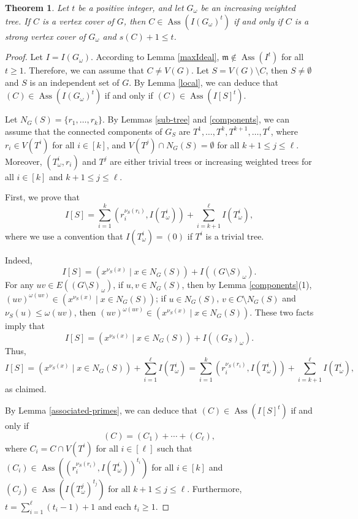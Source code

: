 \documentclass[12pt,amscd]{amsart}
\DeclareMathOperator{\ass}{Ass}
\newtheorem{thm}{Theorem}[section]
\theoremstyle{definition}
\def\m {\mathfrak m}
\begin{document}
\begin{thm}\label{main} Let $t$ be a positive integer, and let $G_\omega$ be an increasing weighted tree. If  $C$ is  a vertex cover of $G$, then  $C\in \ass (I(G_\omega)^t)$ if and only if $C$ is a strong vertex cover of $G_\omega$ and  $s(C)+1\leqslant t$.
\end{thm}
\begin{proof} Let $I=I(G_\omega)$.  According to  Lemma \ref{maxIdeal},  $\m\notin \ass(I^t)$ for all $t\geqslant 1$. Therefore,  we can assume that $C\ne V(G)$. Let $S =V(G)\setminus C$, then $S\ne \emptyset$  and $S$ is an independent set of $G$. By Lemma \ref{local}, we can deduce that $(C)\in \ass(I(G_\omega)^t)$ if and only if $(C)\in \ass(I[S]^t)$.
	
	Let $N_G(S)= \{r_1,\ldots,r_k\}$. By Lemmas  \ref{sub-tree} and   \ref{components}, we  can  assume that the connected components of $G_S$ are $T^1,\ldots, T^k, T^{k+1},\ldots, T^{\ell}$, where $r_i\in V(T^i)$ for all $i\in[k]$, and  $V(T^j)\cap N_G(S) = \emptyset$ for all $k+1\le j\le \ell$. Moreover,   $(T^i_\omega,r_i)$ and   $T^j$ are  either  trivial trees or  increasing weighted trees for all $i\in[k]$ and    $k+1\le j\le \ell$.
	
	First, we prove that 
	\begin{equation}\label{LocalS}
		I[S] = \sum_{i=1}^k (r_i^{\nu_S(r_i)},I(T^i_\omega))+\sum_{i=k+1}^{\ell} I(T^i_\omega),
		\tag{$\S$}
	\end{equation}
	where we use a convention that $I(T^i_{\omega}) = (0)$ if $T^i$ is a trivial tree.  

Indeed, $$I[S] = (x^{\nu_S(x)}\mid x\in N_G(S)) + I((G\setminus S)_\omega).$$
 For  any  $uv\in E((G\setminus S)_\omega)$, if  $u,v\in N_G(S)$, then  by Lemma \ref{components}(1),   $(uv)^{\omega(uv)} \in (x^{\nu_S(x)}\mid x\in N_G(S))$; if $u\in N_G(S)$,  $v\in C\setminus N_G(S)$ and  $\nu_S(u) \leqslant \omega(uv)$, then 
   $(uv)^{\omega(uv)} \in (x^{\nu_S(x)}\mid x\in N_G(S))$. These two facts imply that
	$$I[S] = (x^{\nu_S(x)}\mid x\in N_G(S)) + I((G_S)_\omega).$$
	Thus,
	$$I[S] = (x^{\nu_S(x)}\mid x\in N_G(S)) + \sum_{i=1}^{\ell} I(T^i_\omega)
	=\sum_{i=1}^k (r_i^{\nu_S(r_i)},I(T^i_\omega))+\sum_{i=k+1}^{\ell} I(T^i_\omega),$$
	as claimed.
	
	By Lemma \ref{associated-primes}, we can deduce that  $(C)\in \ass(I[S]^t)$ if and only if  
\[
(C)=(C_1)+\cdots +(C_\ell),
\]
where  $C_i =C\cap V(T^i)$ for all $i\in [\ell]$ such that $(C_i)\in \ass((r_i^{\nu_S(r_i)},I(T^i_\omega))^{t_i})$ for all $i\in [k]$ and
$(C_j)\in \ass(I(T^j_\omega)^{t_j})$ for all $k+1\leqslant j\leqslant \ell$. Furthermore,  $t=\sum\limits_{i=1}^{\ell} (t_i-1) + 1$ and each  $t_i\geqslant 1$.


\end{proof}
\end{document}
